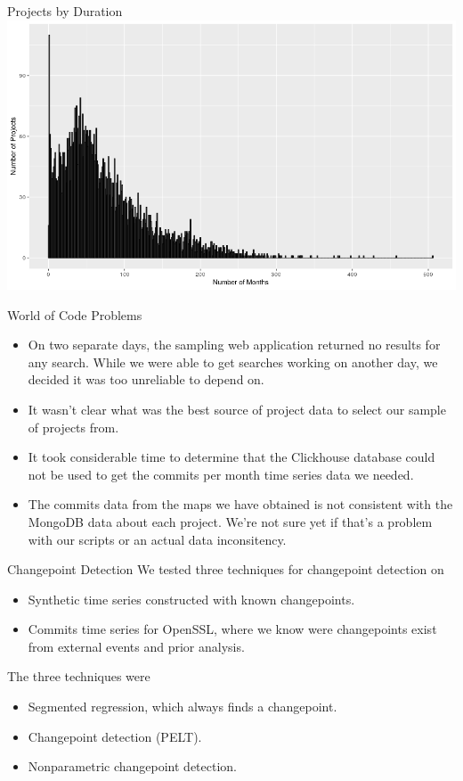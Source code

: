\documentclass[11pt,handout]{beamer}
\begin{document}
\begin{frame}{Projects by Duration}
    \includegraphics[width=\textwidth,keepaspectratio]{project-durations.png}
\end{frame}

\begin{frame}{World of Code Problems}
\begin{itemize}
    \item On two separate days, the sampling web application returned no results for any search. While we were able to get searches working on another day, we decided it was too unreliable to depend on.    
    \item It wasn't clear what was the best source of project data to select our sample of projects from.
    \item It took considerable time to determine that the Clickhouse database could not be used to get the commits per month time series data we needed.
    \item The commits data from the maps we have obtained is not consistent with the MongoDB data about each project. We're not sure yet if that's a problem with our scripts or an actual data inconsitency.
\end{itemize}
\end{frame}

\begin{frame}{Changepoint Detection}
We tested three techniques for changepoint detection on 
    \begin{itemize}
        \item Synthetic time series constructed with known changepoints.
        \item Commits time series for OpenSSL, where we know were changepoints exist from external events and prior analysis.
    \end{itemize}
The three techniques were
    \begin{itemize}
        \item Segmented regression, which always finds a changepoint.
        \item Changepoint detection (PELT).
        \item Nonparametric changepoint detection.
    \end{itemize}
\end{frame}
\end{document}
